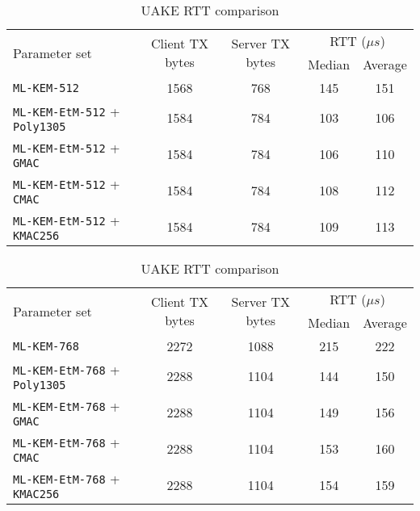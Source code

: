 \documentclass[runningheads]{llncs}
\newcommand{\us}{\mu s}
\begin{document}
\begin{table}[h]
    \centering
    \footnotesize
    \caption{UAKE RTT comparison}\label{tbl:uake-rtt}
    \begin{tabular}{|p{14em}|c|c|c|c|}
        \hline
        \multirow{2}{*}{Parameter set}
        & \multirow{2}{*}{Client TX bytes}
        & \multirow{2}{*}{Server TX bytes}
        & \multicolumn{2}{|c|}{RTT ($\us$)} \\
        \cline{4-5}
        & & & Median & Average \\
        \hline
        \texttt{ML-KEM-512} & 1568 & 768 & 145 & 151 \\
        \hline
        \texttt{ML-KEM-EtM-512} + \texttt{Poly1305} & 1584 & 784 & 103 & 106 \\
        \hline
        \texttt{ML-KEM-EtM-512} + \texttt{GMAC} & 1584 & 784 & 106 & 110 \\
        \hline
        \texttt{ML-KEM-EtM-512} + \texttt{CMAC} & 1584 & 784 & 108 & 112 \\
        \hline
        \texttt{ML-KEM-EtM-512} + \texttt{KMAC256} & 1584 & 784 & 109 & 113 \\
        \hline
    \end{tabular}\vspace{0.3cm}

    \begin{tabular}{|p{14em}|c|c|c|c|}
        \hline
        \multirow{2}{*}{Parameter set}
        & \multirow{2}{*}{Client TX bytes}
        & \multirow{2}{*}{Server TX bytes}
        & \multicolumn{2}{|c|}{RTT ($\us$)} \\
        \cline{4-5}
        & & & Median & Average \\
        \hline
        \texttt{ML-KEM-768} & 2272 & 1088 & 215 & 222 \\
        \hline
        \texttt{ML-KEM-EtM-768} + \texttt{Poly1305} & 2288 & 1104 & 144 & 150 \\
        \hline
        \texttt{ML-KEM-EtM-768} + \texttt{GMAC} & 2288 & 1104 & 149 & 156 \\
        \hline
        \texttt{ML-KEM-EtM-768} + \texttt{CMAC} & 2288 & 1104 & 153 & 160 \\
        \hline
        \texttt{ML-KEM-EtM-768} + \texttt{KMAC256} & 2288 & 1104 & 154 & 159 \\
        \hline
    \end{tabular}\vspace{0.3cm}


\end{table}
\end{document}

